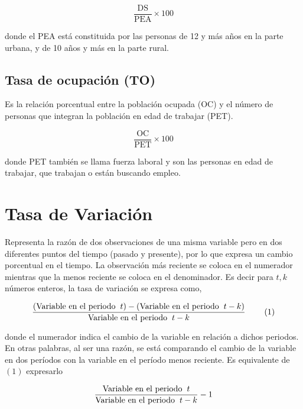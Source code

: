 \documentclass[
  11pt,
]{book}
\begin{document}
\[\frac{\text{DS}}{\text{PEA}}\times 100\]

donde el PEA está constituida por las personas de 12 y más años en la parte urbana, y de 10 años y más en la parte rural.

\hypertarget{tasa-de-ocupaciuxf3n-to}{%
\subsection{Tasa de ocupación (TO)}\label{tasa-de-ocupaciuxf3n-to}}

Es la relación porcentual entre la población ocupada (OC) y el
número de personas que integran la población en edad de trabajar (PET).

\[\frac{\text{OC}}{\text{PET}}\times 100\]

donde PET también se llama fuerza laboral y son las personas en edad de trabajar, que trabajan o están buscando empleo.

\hypertarget{tasavariaciuxf3n}{%
\section{Tasa de Variación}\label{tasavariaciuxf3n}}

Representa la razón de dos observaciones de una misma variable pero en dos diferentes puntos del tiempo (pasado y presente), por lo que expresa un cambio porcentual en el tiempo. La observación más reciente se coloca en el numerador mientras que la menos reciente se coloca en el denominador. Es decir para \(t,k\) números enteros, la tasa de variación se expresa como,

\[\begin{equation}
\frac{\text{(Variable en el periodo}\hspace{2mm} t)-(\text{Variable en el periodo} \hspace{2mm} t-k)}{\text{Variable en el periodo} \hspace{2mm} t-k} \hspace{8mm} \text{(1)}
\end{equation}\]

donde el numerador indica el cambio de la variable en relación a dichos periodos. En otras palabras, al ser una razón, se está comparando el cambio de la variable en dos períodos con la variable en el período menos reciente. Es equivalente de \((1)\) expresarlo

\[\begin{equation}
\frac{\text{Variable en el periodo}\hspace{2mm} t}{\text{Variable en el periodo} \hspace{2mm} t-k}-1
\end{equation}\]
\end{document}
